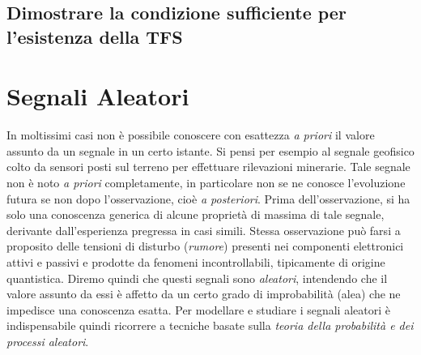 \documentclass[12pt,oneside,openany]{memoir}
\numberwithin{equation}{subsection}
\begin{document}

\newpage
\subsection{Dimostrare la condizione sufficiente per l'esistenza della TFS}


\newpage	
\section{Segnali Aleatori}
In moltissimi casi non \`e possibile conoscere con esattezza \textit{a priori}
il valore assunto da un segnale in un certo istante. Si pensi per esempio al
segnale geofisico colto da sensori posti sul terreno per effettuare rilevazioni
minerarie. Tale segnale non \`e noto \textit{a priori} completamente, in
particolare non se ne conosce l'evoluzione futura se non dopo l'osservazione,
cio\`e \textit{a posteriori}. Prima dell'osservazione, si ha solo una conoscenza
generica di alcune propriet\`a di massima di tale segnale, derivante
dall'esperienza pregressa in casi simili. Stessa osservazione pu\`o farsi a
proposito delle tensioni di disturbo (\textit{rumore}) presenti nei componenti
elettronici attivi e passivi e prodotte da fenomeni incontrollabili, tipicamente
di origine quantistica. Diremo quindi che questi segnali sono \textit{aleatori},
intendendo che il valore assunto da essi \`e affetto da un certo grado di
improbabilit\`a (alea) che ne impedisce una conoscenza esatta. 
Per modellare e studiare i segnali aleatori \`e indispensabile quindi ricorrere
a tecniche basate sulla \textit{teoria della probabilit\`a e dei processi
aleatori}.


\newpage
\end{document}
